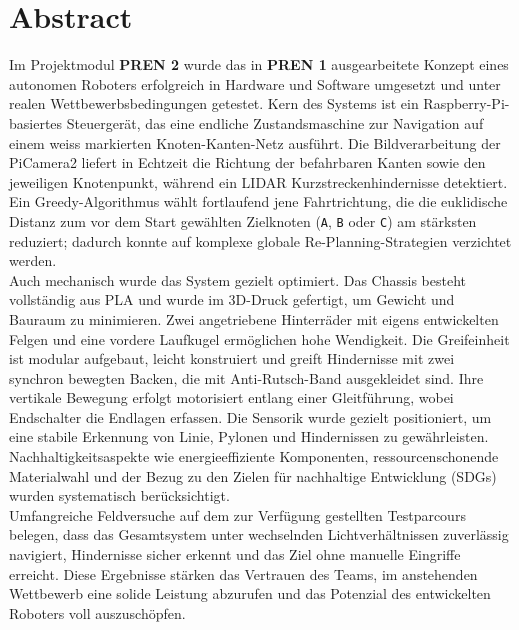 \documentclass[main.tex]{subfiles} %
\begin{document}
\section*{Abstract}

Im Projektmodul \textbf{PREN 2} wurde das in \textbf{PREN 1} ausgearbeitete
Konzept eines autonomen Roboters erfolgreich in Hardware und Software
umgesetzt und unter realen Wettbewerbsbedingungen getestet.
Kern des Systems ist ein Raspberry-Pi-basiertes Steuergerät, das eine
endliche Zustandsmaschine zur Navigation auf einem weiss markierten
Knoten-Kanten-Netz ausführt. Die Bildverarbeitung der PiCamera2
liefert in Echtzeit die Richtung der befahrbaren Kanten sowie den
jeweiligen Knotenpunkt, während ein LIDAR Kurzstreckenhindernisse
detektiert. Ein Greedy-Algorithmus wählt fortlaufend jene Fahrtrichtung,
die die euklidische Distanz zum vor dem Start gewählten Zielknoten
(\texttt{A}, \texttt{B} oder \texttt{C}) am stärksten reduziert; dadurch
konnte auf komplexe globale Re-Planning-Strategien verzichtet werden.\\

Auch mechanisch wurde das System gezielt optimiert. Das Chassis besteht 
vollständig aus PLA und wurde im 3D-Druck gefertigt, um Gewicht und Bauraum 
zu minimieren. Zwei angetriebene Hinterräder mit eigens entwickelten Felgen 
und eine vordere Laufkugel ermöglichen hohe Wendigkeit. Die Greifeinheit 
ist modular aufgebaut, leicht konstruiert und greift Hindernisse mit zwei 
synchron bewegten Backen, die mit Anti-Rutsch-Band ausgekleidet sind. Ihre 
vertikale Bewegung erfolgt motorisiert entlang einer Gleitführung, wobei 
Endschalter die Endlagen erfassen. Die Sensorik wurde gezielt positioniert, 
um eine stabile Erkennung von Linie, Pylonen und Hindernissen zu 
gewährleisten.\\

Nachhaltigkeitsaspekte wie energieeffiziente Komponenten, ressourcenschonende
Materialwahl und der Bezug zu den Zielen für nachhaltige Entwicklung (SDGs) wurden
systematisch berücksichtigt.\\

Umfangreiche Feldversuche auf dem zur Verfügung gestellten Testparcours belegen,
dass das Gesamtsystem unter wechselnden Lichtverhältnissen zuverlässig
navigiert, Hindernisse sicher erkennt und das Ziel ohne manuelle Eingriffe
erreicht. Diese Ergebnisse stärken das Vertrauen des Teams, im anstehenden
Wettbewerb eine solide Leistung abzurufen und das Potenzial des entwickelten
Roboters voll auszuschöpfen.
\end{document}
